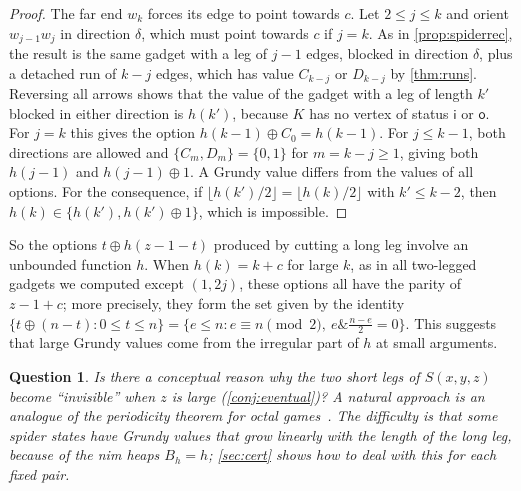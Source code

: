 \documentclass[11pt]{amsart}
\newtheorem{question}[theorem]{Question}
\theoremstyle{definition}
\theoremstyle{remark}
\newcommand{\si}{\mathsf{i}}
\newcommand{\so}{\mathsf{o}}
\newcommand{\Sp}{S}
\begin{document}
\begin{proof}
The far end $w_k$ forces its edge to point towards $c$. Let $2\le j\le k$ and orient $w_{j-1}w_j$ in direction $\delta$, which must point towards $c$ if $j=k$. As in \cref{prop:spiderrec}, the result is the same gadget with a leg of $j-1$ edges, blocked in direction $\delta$, plus a detached run of $k-j$ edges, which has value $C_{k-j}$ or $D_{k-j}$ by \cref{thm:runs}. Reversing all arrows shows that the value of the gadget with a leg of length $k'$ blocked in either direction is $h(k')$, because $K$ has no vertex of status $\si$ or $\so$. For $j=k$ this gives the option $h(k-1)\oplus C_0=h(k-1)$. For $j\le k-1$, both directions are allowed and $\{C_m,D_m\}=\{0,1\}$ for $m=k-j\ge1$, giving both $h(j-1)$ and $h(j-1)\oplus1$. A Grundy value differs from the values of all options. For the consequence, if $\lfloor h(k')/2\rfloor=\lfloor h(k)/2\rfloor$ with $k'\le k-2$, then $h(k)\in\{h(k'),h(k')\oplus1\}$, which is impossible.
\end{proof}

So the options $t\oplus h(z-1-t)$ produced by cutting a long leg involve an unbounded function $h$. When $h(k)=k+c$ for large $k$, as in all two-legged gadgets we computed except $(1,2j)$, these options all have the parity of $z-1+c$; more precisely, they form the set given by the identity $\{t\oplus(n-t):0\le t\le n\}=\{e\le n: e\equiv n\pmod 2,\ e\mathbin{\&}\tfrac{n-e}{2}=0\}$. This suggests that large Grundy values come from the irregular part of $h$ at small arguments.

\begin{question}
Is there a conceptual reason why the two short legs of $\Sp(x,y,z)$ become ``invisible'' when $z$ is large (\cref{conj:eventual})? A natural approach is an analogue of the periodicity theorem for octal games~\cite{GuySmith1956,WinningWays}. The difficulty is that some spider states have Grundy values that grow linearly with the length of the long leg, because of the nim heaps $B_h=h$; \cref{sec:cert} shows how to deal with this for each fixed pair.
\end{question}
\end{document}
